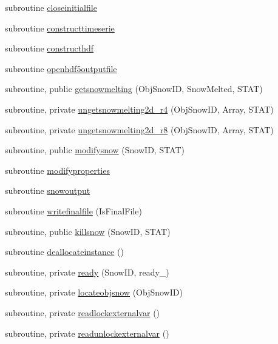 \begin{DoxyCompactItemize}
\item 
subroutine \mbox{\hyperlink{namespacemodulesnow_aab9a2dba663d0f96350797dd7fbd0923}{closeinitialfile}}
\item 
subroutine \mbox{\hyperlink{namespacemodulesnow_aad7eea4b66e4c45d4d4cc09cacabb4a4}{constructtimeserie}}
\item 
subroutine \mbox{\hyperlink{namespacemodulesnow_a83ff8967e79c730436ab635d92f70eaf}{constructhdf}}
\item 
subroutine \mbox{\hyperlink{namespacemodulesnow_a65a805e3fa668273a96e5a6c2f76644d}{openhdf5outputfile}}
\item 
subroutine, public \mbox{\hyperlink{namespacemodulesnow_a6d79f4685f7a014eb4967e32297c5f09}{getsnowmelting}} (Obj\+Snow\+ID, Snow\+Melted, S\+T\+AT)
\item 
subroutine, private \mbox{\hyperlink{namespacemodulesnow_ad46c82bdf9dd0bdd57a7edce05221094}{ungetsnowmelting2d\+\_\+r4}} (Obj\+Snow\+ID, Array, S\+T\+AT)
\item 
subroutine, private \mbox{\hyperlink{namespacemodulesnow_a042504d2eebab701131d198c2c1146d5}{ungetsnowmelting2d\+\_\+r8}} (Obj\+Snow\+ID, Array, S\+T\+AT)
\item 
subroutine, public \mbox{\hyperlink{namespacemodulesnow_a4bf35b96ab1a5b04412fedf95560ec5b}{modifysnow}} (Snow\+ID, S\+T\+AT)
\item 
subroutine \mbox{\hyperlink{namespacemodulesnow_aada914398244e3d136722b4c1c7a5abf}{modifyproperties}}
\item 
subroutine \mbox{\hyperlink{namespacemodulesnow_ab811c0f4d09e6ff82a7c0bc8b88a1503}{snowoutput}}
\item 
subroutine \mbox{\hyperlink{namespacemodulesnow_a4a825586dc688763fa3df8c6402fe6c3}{writefinalfile}} (Is\+Final\+File)
\item 
subroutine, public \mbox{\hyperlink{namespacemodulesnow_abd86d0a2403e7608f089a4ee16dab4e6}{killsnow}} (Snow\+ID, S\+T\+AT)
\item 
subroutine \mbox{\hyperlink{namespacemodulesnow_ac9029191079e3096a3bb36742e4d578f}{deallocateinstance}} ()
\item 
subroutine, private \mbox{\hyperlink{namespacemodulesnow_a63b7009f3649ad5fe78d70607da94054}{ready}} (Snow\+ID, ready\+\_\+)
\item 
subroutine, private \mbox{\hyperlink{namespacemodulesnow_abd7d9e3dda07461c69e66347c0a3d904}{locateobjsnow}} (Obj\+Snow\+ID)
\item 
subroutine, private \mbox{\hyperlink{namespacemodulesnow_ac0228c4a338498fe67a6c82ec745030c}{readlockexternalvar}} ()
\item 
subroutine, private \mbox{\hyperlink{namespacemodulesnow_aca134562eba09bf793fd35d399482672}{readunlockexternalvar}} ()
\end{DoxyCompactItemize}
